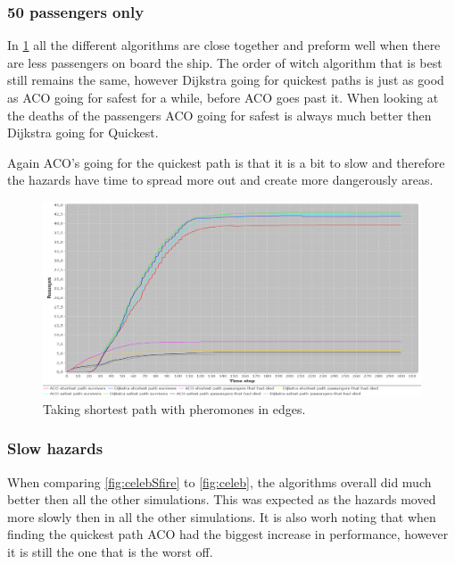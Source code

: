 \subsubsection{50 passengers only}

In \ref{fig:celeb50} all the different algorithms are close together and preform well when there are less passengers on board the ship. The order of witch algorithm that is best still remains the same, however Dijkstra going for quickest paths is just as good as ACO going for safest for a while, before ACO goes past it. When looking at the deaths of the passengers ACO going for safest is always much better then Dijkstra going for Quickest.

Again ACO's going for the quickest path is that it is a bit to slow and therefore the hazards have time to spread more out and create more dangerously areas.

\begin{figure} [float]
\centering
\hspace*{-1.0in}
\includegraphics[scale=0.35]{images/Graph-using-200-rounds-50-passangers.png}
\caption{Taking shortest path with pheromones in edges.}
\label{fig:celeb50}
\end{figure}

\subsubsection{Slow hazards}

When comparing \ref{fig:celebSfire} to \ref{fig:celeb}, the algorithms overall did much better then all the other simulations. This was expected as the hazards moved more slowly then in all the other simulations. It is also worh noting that when finding the quickest path ACO had the biggest increase in performance, however it is still the one that is the worst off.

